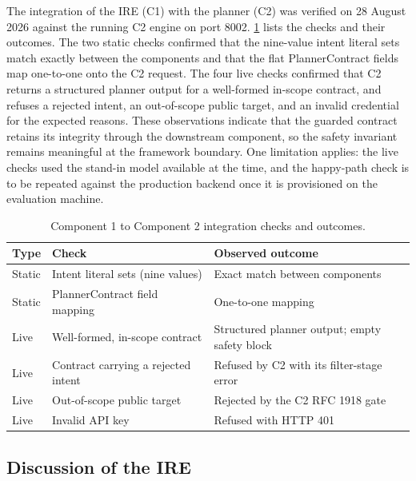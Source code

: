 The integration of the IRE (C1) with the planner (C2) was verified on
28 August 2026 against the running C2 engine on port 8002. \cref{tab:ire-integration}
lists the checks and their outcomes. The two static checks confirmed that the
nine-value intent literal sets match exactly between the components and that the
flat PlannerContract fields map one-to-one onto the C2 request. The four live
checks confirmed that C2 returns a structured planner output for a well-formed
in-scope contract, and refuses a rejected intent, an out-of-scope public target,
and an invalid credential for the expected reasons. These observations indicate
that the guarded contract retains its integrity through the downstream
component, so the safety invariant remains meaningful at the framework boundary.
One limitation applies: the live checks used the stand-in model available at the
time, and the happy-path check is to be repeated against the production backend
once it is provisioned on the evaluation machine.

\begin{table}[htbp]
  \centering
  \begin{tabular}{@{}p{}p{}p{}@{}}
    \toprule
    \textbf{Type} & \textbf{Check} & \textbf{Observed outcome}\\
    \midrule
    Static & Intent literal sets (nine values) & Exact match between components\\
    Static & PlannerContract field mapping & One-to-one mapping\\
    Live & Well-formed, in-scope contract & Structured planner output; empty safety block\\
    Live & Contract carrying a rejected intent & Refused by C2 with its filter-stage error\\
    Live & Out-of-scope public target & Rejected by the C2 RFC 1918 gate\\
    Live & Invalid API key & Refused with HTTP 401\\
    \bottomrule
  \end{tabular}
  \caption{Component 1 to Component 2 integration checks and outcomes.}\label{tab:ire-integration}
\end{table}

\subsection{Discussion of the IRE}\label{sec:results-ire-discussion}

